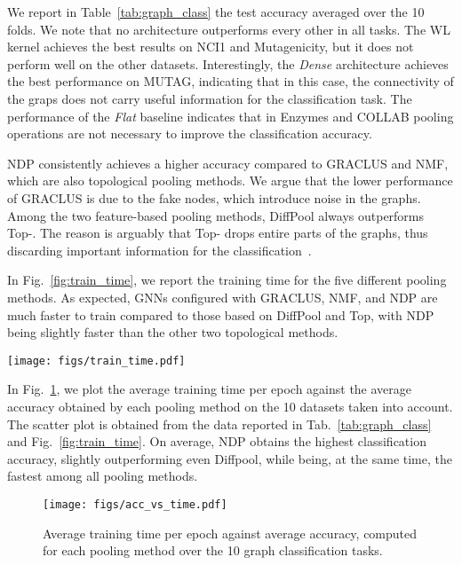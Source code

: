 \documentclass[journal]{IEEEtran}
\begin{document}
We report in Table~\ref{tab:graph_class} the test accuracy averaged over the 10 folds.
We note that no architecture outperforms every other in all tasks.
The WL kernel achieves the best results on NCI1 and Mutagenicity, but it does not perform well on the other datasets.
Interestingly, the \textit{Dense} architecture achieves the best performance on MUTAG, indicating that in this case, the connectivity of the graps does not carry useful information for the classification task.
The performance of the \textit{Flat} baseline indicates that in Enzymes and COLLAB pooling operations are not necessary to improve the classification accuracy.

NDP consistently achieves a higher accuracy compared to GRACLUS and NMF, which are also topological pooling methods.
We argue that the lower performance of GRACLUS is due to the fake nodes, which introduce noise in the graphs.
Among the two feature-based pooling methods, DiffPool always outperforms Top-.
The reason is arguably that Top- drops entire parts of the graphs, thus discarding important information for the classification~\cite{knyazev2019understanding, icml2020_1614}.

In Fig.~\ref{fig:train_time}, we report the training time for the five different pooling methods.
As expected, GNNs configured with GRACLUS, NMF, and NDP are much faster to train compared to those based on DiffPool and Top, with NDP being slightly faster than the other two topological methods.
\begin{figure*}
    \centering
    \texttt{[image: figs/train\_time.pdf]}    
\caption{Average training time per epoch (in seconds) for different pooling methods. The bars height is in logarithmic scale. Simulations were performed with an Nvidia RTX 2080 Ti.}
    \label{fig:train_time}
\end{figure*}
In Fig.~\ref{fig:acc_vs_time}, we plot the average training time per epoch against the average accuracy obtained by each pooling method on the 10 datasets taken into account. 
The scatter plot is obtained from the data reported in Tab.~\ref{tab:graph_class} and Fig.~\ref{fig:train_time}.
On average, NDP obtains the highest classification accuracy, slightly outperforming even Diffpool, while being, at the same time, the fastest among all pooling methods.
\begin{figure}
    \centering
    \texttt{[image: figs/acc\_vs\_time.pdf]}    
\caption{Average training time per epoch against average accuracy, computed for each pooling method over the 10 graph classification tasks.}
    \label{fig:acc_vs_time}
\end{figure}
\end{document}
